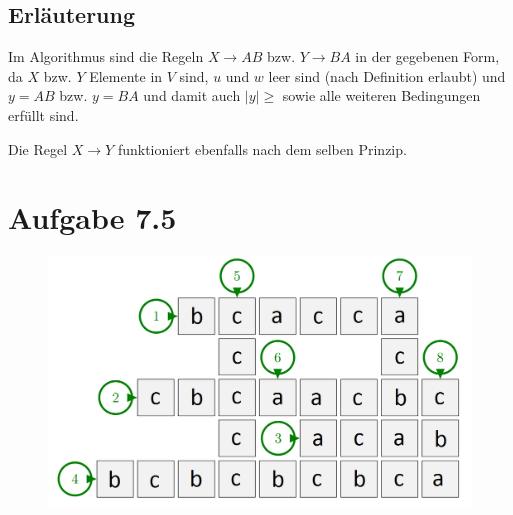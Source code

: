\documentclass{article}
\begin{document}
\subsection*{Erläuterung}
Im Algorithmus sind die Regeln $X \rightarrow AB$ bzw. $Y \rightarrow BA$ in der gegebenen Form, da $X$ bzw. $Y$ Elemente in $V$ sind, $u$ und $w$ leer sind (nach Definition erlaubt) und $y=AB$ bzw. $y=BA$ und damit auch $|y|\geq$ sowie alle weiteren Bedingungen erfüllt sind.

Die Regel $X \rightarrow Y$ funktioniert ebenfalls nach dem selben Prinzip.


\section*{Aufgabe 7.5}
\begin{figure}[ht]
  \includegraphics[scale=0.4]{crossword.png}
\end{figure}
\end{document}
